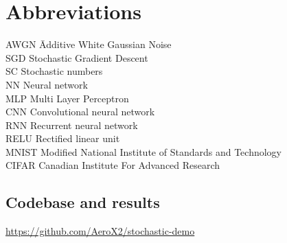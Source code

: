 \documentclass[a4paper,oneside,phd,etd]{BYUPhys}
\begin{document}
\clearemptydoublepage
\chapter{Abbreviations}
\label{chap:abbreviations}

\begin{tabbing}

AWGN \qquad \qquad \= Additive White Gaussian Noise\\
SGD \> Stochastic Gradient Descent\\
SC \> Stochastic numbers\\
NN \> Neural network \\
MLP \> Multi Layer Perceptron \\
CNN \> Convolutional neural network \\
RNN \> Recurrent neural network \\
RELU \> Rectified linear unit \\
MNIST \> Modified National Institute of Standards and Technology \\
CIFAR \> Canadian Institute For Advanced Research \\
\end{tabbing}


\appendix
\section{Codebase and results}
\url{https://github.com/AeroX2/stochastic-demo}

%

%

%
\end{document}

